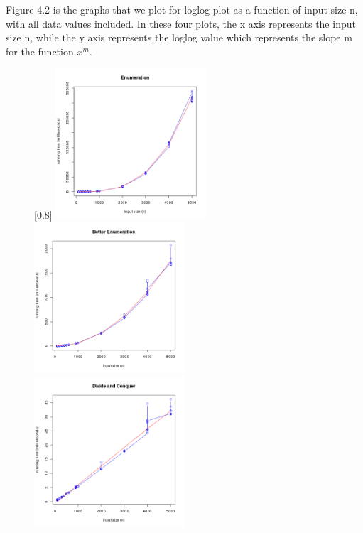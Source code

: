\documentclass[11pt]{scrreprt}
\begin{document}
Figure 4.2 is the graphs that we plot for loglog plot as a function of input size n, with all data values included. In these four plots, the x axis represents the input size n, while the y axis represents the loglog value which represents the slope m for the function $x^m$.

\begin{figure}
	\captionsetup{singlelinecheck=off}
	\captionsetup[subfigure]{singlelinecheck=on}
	[0.8\textwidth]{%
		\includegraphics[width=0.50\textwidth]{enumeration.png}%
		\includegraphics[width=0.50\textwidth]{better_enumeration.png}\\
		\includegraphics[width=0.50\textwidth]{divide_n_conquer.png}%
}
\end{figure}
\end{document}
